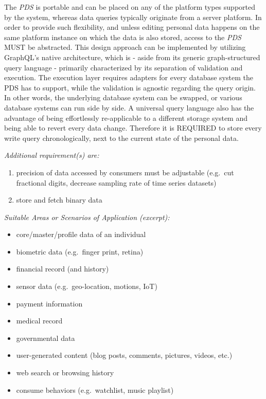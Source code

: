 \documentclass[12pt,english,a4paper,titlepage,cleardoublepage=empty,dottedtoc]{report}
\providecommand{\tightlist}{%
  \setlength{\itemsep}{0pt}\setlength{\parskip}{0pt}}
\begin{document}
The \emph{PDS} is portable and can be placed on any of the platform
types supported by the system, whereas data queries typically originate
from a server platform. In order to provide such flexibility, and unless
editing personal data happens on the same platform instance on which the
data is also stored, access to the \emph{PDS} MUST be abstracted. This
design approach can be implemented by utilizing GraphQL's native
architecture, which is - aside from its generic graph-structured query
language - primarily characterized by its separation of validation and
execution. The execution layer requires adapters for every database
system the PDS has to support, while the validation is agnostic
regarding the query origin. In other words, the underlying database
system can be swapped, or various database systems can run side by side.
A universal query language also has the advantage of being effortlessly
re-applicable to a different storage system and being able to revert
every data change. Therefore it is REQUIRED to store every write query
chronologically, next to the current state of the personal data.

\emph{Additional requirement(s) are:}

\begin{enumerate}
\def\labelenumi{\alph{enumi})}
\tightlist
\item
  precision of data accessed by consumers must be adjustable (e.g.~cut
  fractional digits, decrease sampling rate of time series datasets)\\
\item
  store and fetch binary data
\end{enumerate}

\emph{Suitable Areas or Scenarios of Application (excerpt):}

\begin{itemize}
\tightlist
\item
  core/master/profile data of an individual
\item
  biometric data (e.g.~finger print, retina)
\item
  financial record (and history)
\item
  sensor data (e.g.~geo-location, motions, IoT)
\item
  payment information
\item
  medical record
\item
  governmental data
\item
  user-generated content (blog posts, comments, pictures, videos, etc.)
\item
  web search or browsing history
\item
  consume behaviors (e.g.~watchlist, music playlist)
\end{itemize}
\end{document}

